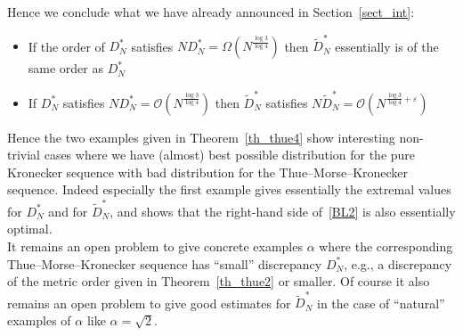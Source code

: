 \documentclass[12pt]{amsart}
\newcommand {\ve} {\varepsilon}
\begin{document}
Hence we conclude what we have already announced in Section~\ref{sect_int}:
\begin{itemize}
\item [-] If the order of $D_{N}^{*}$ satisfies $N D_{N}^{*}= \Omega \left(N^{\frac{\log 3}{\log 4}}\right)$ then $\widetilde{D}_{N}^{*}$ essentially is of the same order as $D_{N}^{*}$
\item [-] If $D_{N}^{*}$ satisfies $N D_{N}^{*} = \mathcal{O} \left(N^{\frac{\log 3}{\log 4}}\right)$ then $\widetilde{D}_{N}^{*}$ satisfies $N \widetilde{D}_{N}^{*}= \mathcal{O} \left(N^{\frac{\log 3}{\log 4} + \ve}\right)$
\end{itemize}
Hence the two examples given in Theorem~\ref{th_thue4} show interesting non-trivial cases where we have (almost) best possible distribution for the pure Kronecker sequence with bad distribution for the Thue--Morse--Kronecker sequence. Indeed especially the first example gives essentially the extremal values for $D_{N}^{*}$ and for $\widetilde{D}_{N}^{*}$, and shows that the right-hand side of~\eqref{BL2} is also essentially optimal.\\

It remains an open problem to give concrete examples $\alpha$ where the corresponding Thue--Morse--Kronecker sequence has ``small'' discrepancy $D_{N}^{*}$, e.g., a discrepancy of the metric order given in Theorem~\ref{th_thue2} or smaller. Of course it also remains an open problem to give good estimates for $\widetilde{D}_{N}^{*}$ in the case of ``natural'' examples of $\alpha$ like $\alpha = \sqrt{2}$.\\
\end{document}
